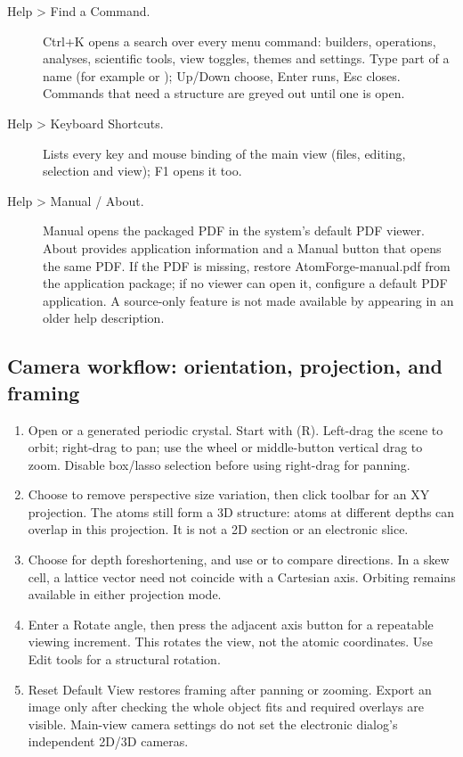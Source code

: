 \begin{description}
\item[Help > Find a Command.] Ctrl+K opens a search over every menu command: builders, operations, analyses, scientific tools, view toggles, themes and settings. Type part of a name (for example  or ); Up/Down choose, Enter runs, Esc closes. Commands that need a structure are greyed out until one is open.
\item[Help > Keyboard Shortcuts.] Lists every key and mouse binding of the main view (files, editing, selection and view); F1 opens it too.
\item[Help > Manual / About.] Manual opens the packaged PDF in the system's default PDF viewer. About provides application information and a Manual button that opens the same PDF. If the PDF is missing, restore AtomForge-manual.pdf from the application package; if no viewer can open it, configure a default PDF application. A source-only feature is not made available by appearing in an older help description.
\end{description}

\subsection{Camera workflow: orientation, projection, and framing}
\begin{enumerate}
\item Open  or a generated periodic crystal. Start with  (R). Left-drag the scene to orbit; right-drag to pan; use the wheel or middle-button vertical drag to zoom. Disable box/lasso selection before using right-drag for panning.
\item Choose  to remove perspective size variation, then click toolbar  for an XY projection. The atoms still form a 3D structure: atoms at different depths can overlap in this projection. It is not a 2D section or an electronic slice.
\item Choose  for depth foreshortening, and use  or  to compare directions. In a skew cell, a lattice vector need not coincide with a Cartesian axis. Orbiting remains available in either projection mode.
\item Enter a Rotate angle, then press the adjacent axis button for a repeatable viewing increment. This rotates the view, not the atomic coordinates. Use Edit tools for a structural rotation.
\item Reset Default View restores framing after panning or zooming. Export an image only after checking the whole object fits and required overlays are visible. Main-view camera settings do not set the electronic dialog's independent 2D/3D cameras.
\end{enumerate}

